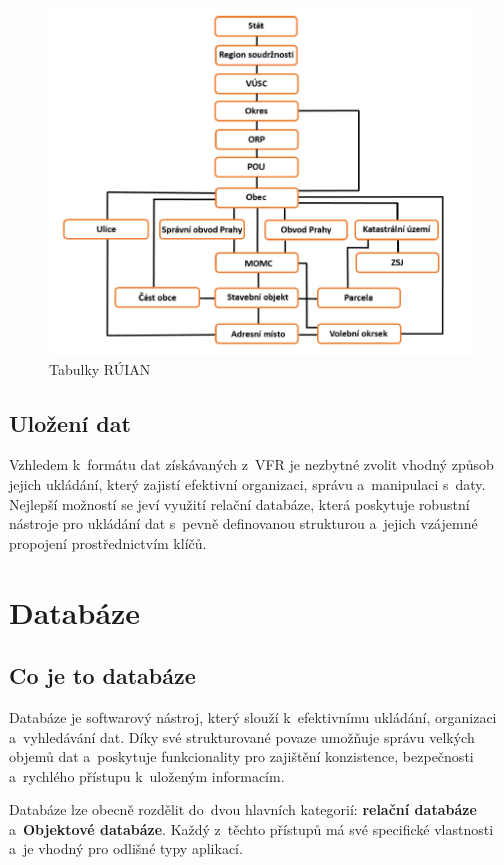 \documentclass[czech, kiv, ba, he, iso690auyr, pdf]{fasthesis}
\begin{document}
\begin{figure}[ht]
    \centering
    \includegraphics[width=\textwidth]{figures/ruian_tables.png}
    \caption{Tabulky RÚIAN}
    \label{fig:ruian_tables}
\end{figure}


\section{Uložení dat}
Vzhledem k~formátu dat získávaných z~VFR je nezbytné zvolit 
vhodný způsob jejich ukládání, který zajistí efektivní organizaci, správu a~manipulaci s~daty. 
Nejlepší možností se jeví využití relační databáze, která poskytuje robustní nástroje pro 
ukládání dat s~pevně definovanou strukturou a~jejich vzájemné propojení prostřednictvím klíčů.

\chapter{Databáze}
\section{Co je to databáze}
Databáze je softwarový nástroj, který slouží k~efektivnímu ukládání, organizaci a~vyhledávání dat. 
Díky své strukturované povaze umožňuje správu velkých objemů dat a~poskytuje funkcionality pro 
zajištění konzistence, bezpečnosti a~rychlého přístupu k~uloženým informacím.

Databáze lze obecně rozdělit do~dvou hlavních kategorií: \textbf{relační databáze} a~\textbf{Objektové databáze}. 
Každý z~těchto přístupů má své specifické vlastnosti a~je vhodný pro odlišné typy aplikací.
\end{document}
